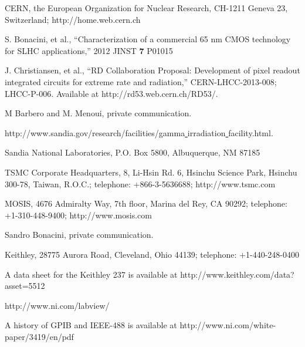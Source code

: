 



CERN, the European Organization for Nuclear Research, CH-1211 Geneva 23, Switzerland;
http://home.web.cern.ch

S. Bonacini, et al., ``Characterization of a commercial 65 nm CMOS technology for SLHC applications,''
2012 JINST {\bf 7} P01015

J. Christiansen, et al., ``RD Collaboration Proposal: Development of pixel readout integrated circuits for extreme rate and radiation,''
CERN-LHCC-2013-008; LHCC-P-006.
Available at http://rd53.web.cern.ch/RD53/.

M Barbero and M. Menoui, private communication.

http://www.sandia.gov/research/facilities/gamma\underline{ }irradiation\underline{ }facility.html.

Sandia National Laboratories, P.O. Box 5800, Albuquerque, NM 87185

TSMC Corporate Headquarters, 8, Li-Hsin Rd. 6, Hsinchu Science Park, Hsinchu 300-78, Taiwan, R.O.C.; telephone: +866-3-5636688;
http://www.tsmc.com

MOSIS, 4676 Admiralty Way, 7th floor, Marina del Rey, CA  90292; telephone: +1-310-448-9400;
http://www.mosis.com

Sandro Bonacini, private communication.

Keithley, 28775 Aurora Road, Cleveland, Ohio 44139; telephone: +1-440-248-0400

A data sheet for the Keithley 237 is available at
http://www.keithley.com/data?asset=5512

http://www.ni.com/labview/

A history of GPIB and IEEE-488 is available at http://www.ni.com/white-paper/3419/en/pdf

